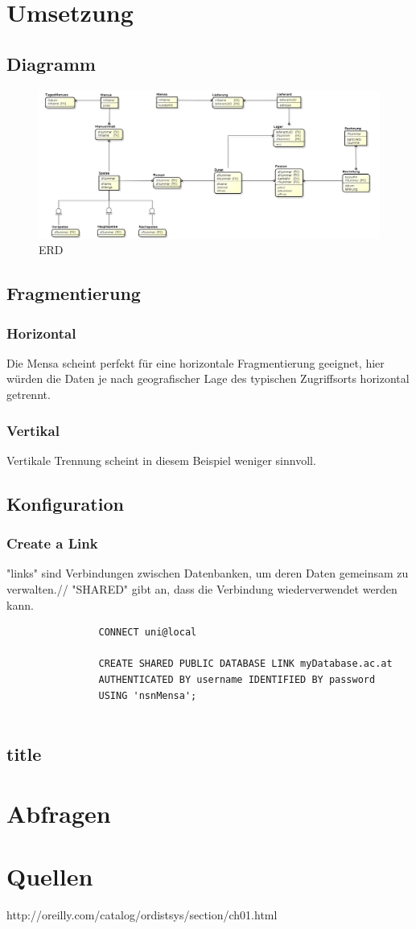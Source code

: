 \documentclass[12pt,a4paper]{article}
\begin{document}
	\section{Umsetzung}
		\subsection{Diagramm}
			\begin{figure}[h!]
				\centering
				\includegraphics[width=1\linewidth]{ERD/MensaEr.png}
				\caption{ERD}
				\label{fig:MensaEr.png}
			\end{figure}
		\subsection{Fragmentierung}
			\subsubsection{Horizontal}
				Die Mensa scheint perfekt für eine horizontale Fragmentierung geeignet, hier würden die Daten je nach geografischer Lage des typischen Zugriffsorts horizontal getrennt.
			\subsubsection{Vertikal}
				Vertikale Trennung scheint in diesem Beispiel weniger sinnvoll.
		\subsection{Konfiguration}
			\subsubsection{Create a Link}
			
				"links" sind Verbindungen zwischen Datenbanken, um deren Daten gemeinsam zu verwalten.//
				"SHARED" gibt an, dass die Verbindung wiederverwendet werden kann.
				\begin{verbatim}
				CONNECT uni@local
				
				CREATE SHARED PUBLIC DATABASE LINK myDatabase.ac.at
				AUTHENTICATED BY username IDENTIFIED BY password
				USING 'nsnMensa';
				
				\end{verbatim}
				
				
			\subsection{title}
	
\section{Abfragen}
	\section{Quellen}
		http://oreilly.com/catalog/ordistsys/section/ch01.html
\end{document}
